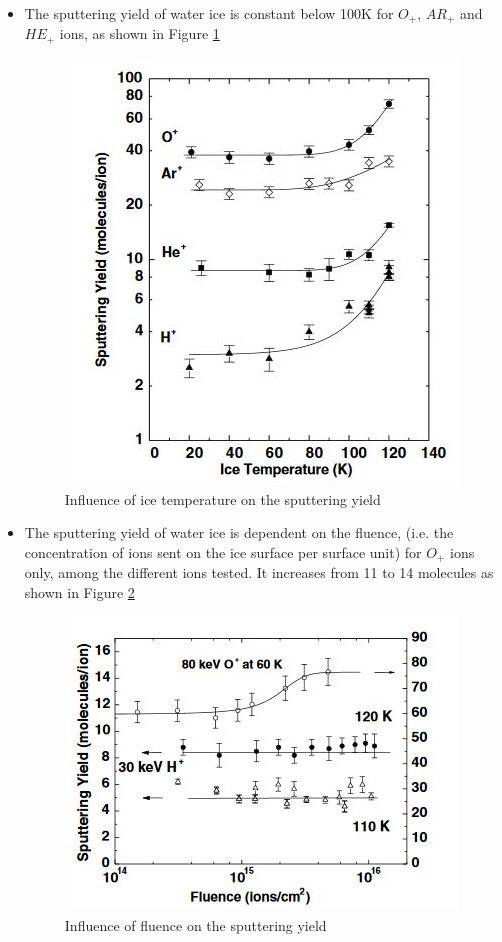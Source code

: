 \begin{itemize}
    \item {The sputtering yield of water ice is constant below 100K for $O_{+}$, $AR_{+}$ and $HE_{+}$ ions, as shown in Figure \ref{sputtering30kev}}
    
    \begin{figure}[H]		
\begin{center}
\includegraphics{Paul/sputtering30kev.JPG}
\end{center}
\caption{Influence of ice temperature on the sputtering yield}
\label{sputtering30kev}
\end{figure}

    \item {The sputtering yield of water ice is dependent on the fluence, (i.e. the concentration of ions sent on the ice surface per surface unit) for $O_{+}$ ions only, among the different ions tested. It increases from 11 to 14 molecules as shown in Figure \ref{sputteringfluence}}
    
    \begin{figure}[H]		
\begin{center}
\includegraphics{Paul/sputteringfluence.JPG}
\end{center}
\caption{Influence of fluence on the sputtering yield}
\label{sputteringfluence}
\end{figure}


\end{itemize}
